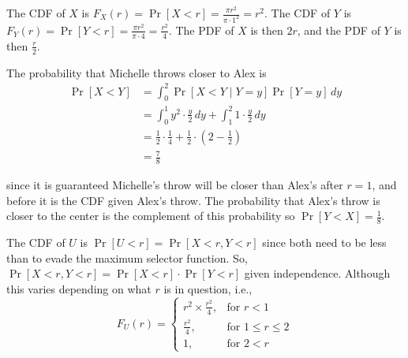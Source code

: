 \documentclass[11pt]{article}
\begin{document}
\begin{solution}
    
\begin{Parts}
    
\Part The CDF of $X$ is $F_X(r) = \Pr[X < r] = \frac{\pi r^2}{\pi \cdot 1^2} = 
r^2$. The CDF of $Y$ is $F_Y(r) = \Pr[Y < r] = \frac{\pi r^2}{\pi \cdot 4} = 
\frac{r^2}{4}$. The PDF of $X$ is then $2r$, and the PDF of $Y$ is then 
$\frac{r}{2}$.

\Part The probability that Michelle throws closer to Alex is 
\[
    \begin{split}
        \Pr[X < Y] &= \int_{0}^{2} \Pr[X < Y \mid Y = y] \Pr[Y = y] \, dy \\
        &= \int_{0}^{1} y^2 \cdot \frac{y}{2} \, dy + \int_{1}^{2} 1 \cdot \frac{y}{2} \, dy \\
        &= \frac{1}{2} \cdot \frac{1}{4} + \frac{1}{2} \cdot \left( 2- \frac{1}{2} \right) \\
        &= \frac{7}{8}
    \end{split}
\]

since it is guaranteed Michelle's throw will be closer than Alex's after $r=1$,
and before it is the CDF given Alex's throw. The probability that Alex's throw 
is closer to the center is the complement of this probability so $\Pr[Y < X] = 
\frac{1}{8}$.

\Part The CDF of $U$ is $\Pr[U < r] = \Pr[X < r, Y < r]$ since both need to be 
less than to evade the maximum selector function. So, $\Pr[X < r, Y < r] = 
\Pr[X < r] \cdot \Pr[Y < r]$ given independence. Although this varies depending
on what $r$ is in question, i.e., 
\[
    F_U(r) = \begin{cases}
        r^2 \times \frac{r^2}{4}, & \text{for } r < 1 \\
        \frac{r^2}{4}, & \text{for } 1 \leq r \leq 2 \\
        1, & \text{for } 2 < r
    \end{cases}
\]

\end{Parts}

\end{solution}
\end{document}
